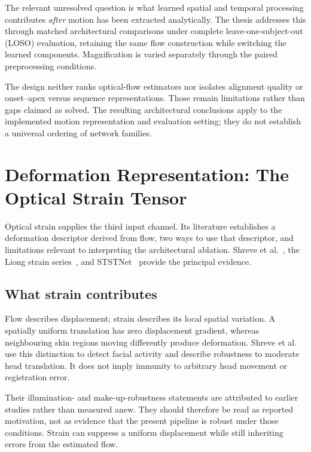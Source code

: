 The relevant unresolved question is what learned spatial and temporal processing contributes \textit{after} motion has been extracted analytically. The thesis addresses this through matched architectural comparisons under complete leave-one-subject-out (LOSO) evaluation, retaining the same flow construction while switching the learned components. Magnification is varied separately through the paired preprocessing conditions.

The design neither ranks optical-flow estimators nor isolates alignment quality or onset--apex versus sequence representations. Those remain limitations rather than gaps claimed as solved. The resulting architectural conclusions apply to the implemented motion representation and evaluation setting; they do not establish a universal ordering of network families.


\section{Deformation Representation: The Optical Strain Tensor}
\label{sec:strain-review}

Optical strain supplies the third input channel. Its literature establishes a deformation descriptor derived from flow, two ways to use that descriptor, and limitations relevant to interpreting the architectural ablation. Shreve et al.~\cite{shreve2011}, the Liong strain series~\cite{liong2014a,liong2014b,liong2016}, and STSTNet~\cite{liong2019b} provide the principal evidence.

\subsection{What strain contributes}
\label{sec:strain-what-adds}

Flow describes displacement; strain describes its local spatial variation. A spatially uniform translation has zero displacement gradient, whereas neighbouring skin regions moving differently produce deformation. Shreve et al.~\cite{shreve2011} use this distinction to detect facial activity and describe robustness to moderate head translation. It does not imply immunity to arbitrary head movement or registration error.

Their illumination- and make-up-robustness statements are attributed to earlier studies rather than measured anew. They should therefore be read as reported motivation, not as evidence that the present pipeline is robust under those conditions. Strain can suppress a uniform displacement while still inheriting errors from the estimated flow.

